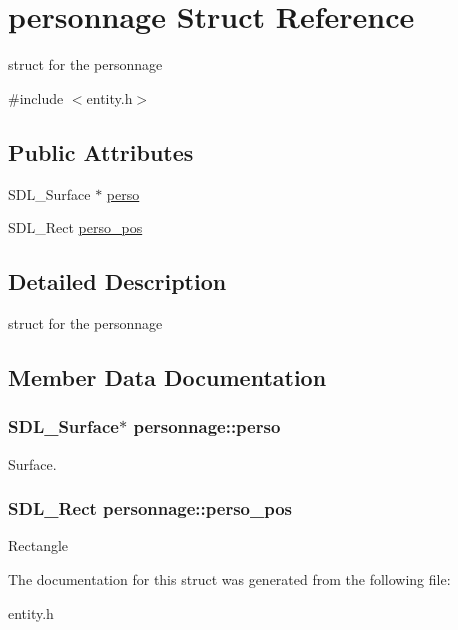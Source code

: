 \hypertarget{structpersonnage}{}\section{personnage Struct Reference}
\label{structpersonnage}


struct for the personnage  




{\ttfamily \#include $<$entity.\+h$>$}

\subsection*{Public Attributes}
\begin{DoxyCompactItemize}
\item 
S\+D\+L\+\_\+\+Surface $\ast$ \hyperlink{structpersonnage_a38531a8ef1c44bf0892c67e4c4b7f063}{perso}
\item 
S\+D\+L\+\_\+\+Rect \hyperlink{structpersonnage_ad280a2f59832f0487ef5ef3c0db45a7d}{perso\+\_\+pos}
\end{DoxyCompactItemize}


\subsection{Detailed Description}
struct for the personnage 

\subsection{Member Data Documentation}
\subsubsection[{\texorpdfstring{perso}{perso}}]{\setlength{\rightskip}{0pt plus 5cm}S\+D\+L\+\_\+\+Surface$\ast$ personnage\+::perso}\hypertarget{structpersonnage_a38531a8ef1c44bf0892c67e4c4b7f063}{}\label{structpersonnage_a38531a8ef1c44bf0892c67e4c4b7f063}
Surface. 
\subsubsection[{\texorpdfstring{perso\+\_\+pos}{perso_pos}}]{\setlength{\rightskip}{0pt plus 5cm}S\+D\+L\+\_\+\+Rect personnage\+::perso\+\_\+pos}\hypertarget{structpersonnage_ad280a2f59832f0487ef5ef3c0db45a7d}{}\label{structpersonnage_ad280a2f59832f0487ef5ef3c0db45a7d}
Rectangle 

The documentation for this struct was generated from the following file\+:\begin{DoxyCompactItemize}
\item 
entity.\+h\end{DoxyCompactItemize}
